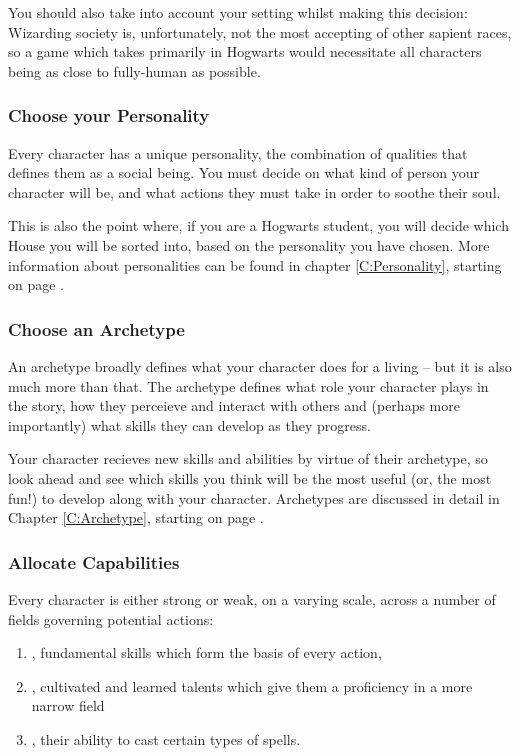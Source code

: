 You should also take into account your setting whilst making this decision: Wizarding society is, unfortunately, not the most accepting of other sapient races, so a game which takes primarily in Hogwarts would necessitate all characters being as close to fully-human as possible.  

\subsubsection*{\itemlist{} Choose your Personality}

Every character has a unique personality, the combination of qualities that defines them as a social being. You must decide on what kind of person your character will be, and what actions they must take in order to soothe their soul. 

This is also the point where, if you are a Hogwarts student, you will decide which House you will be sorted into, based on the personality you have chosen. More information about personalities can be found in chapter \ref{C:Personality}, starting on page \pageref{C:Personality}.

\subsubsection*{\itemlist{} Choose an Archetype}

An archetype broadly defines what your character does for a living -- but it is also much more than that. The archetype defines what role your character plays in the story, how they perceieve and interact with others and (perhaps more importantly) what skills they can develop as they progress. 

Your character recieves new skills and abilities by virtue of their archetype, so look ahead and see which skills you think will be the most useful (or, the most fun!) to develop along with your character. Archetypes are discussed in detail in Chapter \ref{C:Archetype}, starting on page \pageref{C:Archetype}.

\subsubsection*{\itemlist{} Allocate Capabilities}

Every character is either strong or weak, on a varying scale, across a number of fields governing potential actions: 
\begin{enumerate}[itemsep=0em]
\item {}, fundamental skills which form the basis of every action,
\item {}, cultivated and learned talents which give them a proficiency in a more narrow field
\item {}, their ability to cast certain types of spells. 
\end{enumerate}

